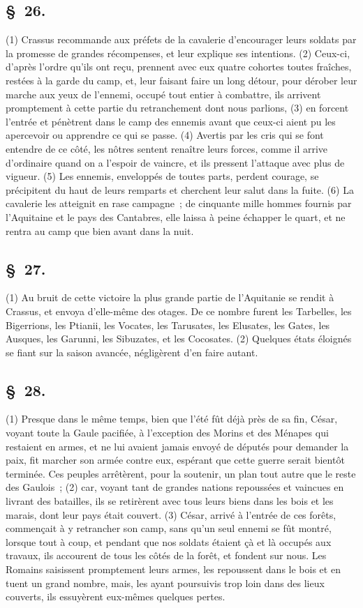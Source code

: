 \documentclass[french,twoside]{book} %
\begin{document}
\subsection[{§ 26.}]{ \textsc{§ 26.} }
\noindent (1) Crassus recommande aux préfets de la cavalerie d’encourager leurs soldats par la promesse de grandes récompenses, et leur explique ses intentions. (2) Ceux-ci, d’après l’ordre qu’ils ont reçu, prennent avec eux quatre cohortes toutes fraîches, restées à la garde du camp, et, leur faisant faire un long détour, pour dérober leur marche aux yeux de l’ennemi, occupé tout entier à combattre, ils arrivent promptement à cette partie du retranchement dont nous parlions, (3) en forcent l’entrée et pénètrent dans le camp des ennemis avant que ceux-ci aient pu les apercevoir ou apprendre ce qui se passe. (4) Avertis par les cris qui se font entendre de ce côté, les nôtres sentent renaître leurs forces, comme il arrive d’ordinaire quand on a l’espoir de vaincre, et ils pressent l’attaque avec plus de vigueur. (5) Les ennemis, enveloppés de toutes parts, perdent courage, se précipitent du haut de leurs remparts et cherchent leur salut dans la fuite. (6) La cavalerie les atteignit en rase campagne ; de cinquante mille hommes fournis par l’Aquitaine et le pays des Cantabres, elle laissa à peine échapper le quart, et ne rentra au camp que bien avant dans la nuit.
\subsection[{§ 27.}]{ \textsc{§ 27.} }
\noindent (1) Au bruit de cette victoire la plus grande partie de l’Aquitanie se rendit à Crassus, et envoya d’elle-même des otages. De ce nombre furent les Tarbelles, les Bigerrions, les Ptianii, les Vocates, les Tarusates, les Elusates, les Gates, les Ausques, les Garunni, les Sibuzates, et les Cocosates. (2) Quelques états éloignés se fiant sur la saison avancée, négligèrent d’en faire autant.
\subsection[{§ 28.}]{ \textsc{§ 28.} }
\noindent (1) Presque dans le même temps, bien que l’été fût déjà près de sa fin, César, voyant toute la Gaule pacifiée, à l’exception des Morins et des Ménapes qui restaient en armes, et ne lui avaient jamais envoyé de députés pour demander la paix, fit marcher son armée contre eux, espérant que cette guerre serait bientôt terminée. Ces peuples arrêtèrent, pour la soutenir, un plan tout autre que le reste des Gaulois ; (2) car, voyant tant de grandes nations repoussées et vaincues en livrant des batailles, ils se retirèrent avec tous leurs biens dans les bois et les marais, dont leur pays était couvert. (3) César, arrivé à l’entrée de ces forêts, commençait à y retrancher son camp, sans qu’un seul ennemi se fût montré, lorsque tout à coup, et pendant que nos soldats étaient çà et là occupés aux travaux, ils accourent de tous les côtés de la forêt, et fondent sur nous. Les Romains saisissent promptement leurs armes, les repoussent dans le bois et en tuent un grand nombre, mais, les ayant poursuivis trop loin dans des lieux couverts, ils essuyèrent eux-mêmes quelques pertes.
\end{document}
